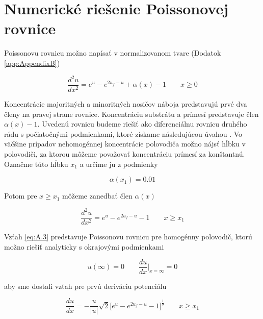 
\chapter{Numerické riešenie Poissonovej rovnice} %

\label{app:AppendixA} %


Poissonovu rovnicu možno napísať v normalizovanom tvare (Dodatok
\ref{app:AppendixB})

\begin{equation}\label{eq:A.1}
{\frac{d^2u}{dx^2} = e^u - e^{2u_f-u} + \alpha(x) - 1} \qquad {x\ge0}
\end{equation}

Koncentrácie majoritných a minoritných nosičov náboja predstavujú prvé
dva členy na pravej strane rovnice. Koncentráciu substrátu a prímesí
predstavuje člen $\alpha(x)-1$. Uvedenú rovnicu budeme riešiť ako
diferenciálnu rovnicu druhého rádu s počiatočnými podmienkami, ktoré
získame následujúcou úvahou \cite{App.1}. Vo väčšine prípadov
nehomogénnej koncentrácie polovodiča možno nájsť hĺbku v polovodiči,
za ktorou môžeme považovať koncentráciu prímesí za konštantnú. Označme
túto hĺbku $x_1$ a určime ju z podmienky

\begin{equation}\label{eq:A.2}
{\alpha(x_1)  =  0.01}
\end{equation}

Potom pre $x\ge{x_1}$  môžeme zanedbať člen $\alpha(x)$

\begin{equation}\label{eq:A.3}
{\frac{d^2u}{dx^2} = e^u -  e^{2u_f-u}  - 1} \qquad {x\ge{x_1}}
\end{equation}

Vzťah \ref{eq:A.3} predstavuje
Poissonovu rovnicu pre homogénny polovodič, ktorú možno riešiť
analyticky s okrajovými podmienkami

\begin{equation}\label{eq:A.4}
u(\infty) = 0 \qquad \frac{du}{dx}\Big\rvert_{x=\infty} = 0
\end{equation}

aby sme dostali vzťah pre prvú deriváciu potenciálu

\begin{equation}\label{eq:A.5}
\frac{du}{dx} = - \frac{u}{|u|} \sqrt{2} \Big[e^u - e^{2u_f-u} - 1
  \Big]^{\frac{1}{2}} \qquad {x\ge{x_1}}
\end{equation}

